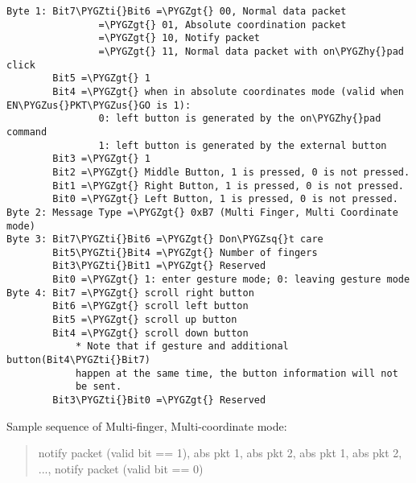 \documentclass[a4paper,8pt,english]{sphinxmanual}
\def\PYGZus{\char`\_}
\def\PYGZgt{\char`\>}
\def\PYGZhy{\char`\-}
\def\PYGZsq{\char`\'}
\def\PYGZti{\char`\~}
\renewcommand\PYGZsq{\textquotesingle}
\begin{document}
\begin{Verbatim}[commandchars=\\\{\}]
Byte 1: Bit7\PYGZti{}Bit6 =\PYGZgt{} 00, Normal data packet
                =\PYGZgt{} 01, Absolute coordination packet
                =\PYGZgt{} 10, Notify packet
                =\PYGZgt{} 11, Normal data packet with on\PYGZhy{}pad click
        Bit5 =\PYGZgt{} 1
        Bit4 =\PYGZgt{} when in absolute coordinates mode (valid when EN\PYGZus{}PKT\PYGZus{}GO is 1):
                0: left button is generated by the on\PYGZhy{}pad command
                1: left button is generated by the external button
        Bit3 =\PYGZgt{} 1
        Bit2 =\PYGZgt{} Middle Button, 1 is pressed, 0 is not pressed.
        Bit1 =\PYGZgt{} Right Button, 1 is pressed, 0 is not pressed.
        Bit0 =\PYGZgt{} Left Button, 1 is pressed, 0 is not pressed.
Byte 2: Message Type =\PYGZgt{} 0xB7 (Multi Finger, Multi Coordinate mode)
Byte 3: Bit7\PYGZti{}Bit6 =\PYGZgt{} Don\PYGZsq{}t care
        Bit5\PYGZti{}Bit4 =\PYGZgt{} Number of fingers
        Bit3\PYGZti{}Bit1 =\PYGZgt{} Reserved
        Bit0 =\PYGZgt{} 1: enter gesture mode; 0: leaving gesture mode
Byte 4: Bit7 =\PYGZgt{} scroll right button
        Bit6 =\PYGZgt{} scroll left button
        Bit5 =\PYGZgt{} scroll up button
        Bit4 =\PYGZgt{} scroll down button
            * Note that if gesture and additional button(Bit4\PYGZti{}Bit7)
            happen at the same time, the button information will not
            be sent.
        Bit3\PYGZti{}Bit0 =\PYGZgt{} Reserved
\end{Verbatim}

Sample sequence of Multi-finger, Multi-coordinate mode:
\begin{quote}

notify packet (valid bit == 1), abs pkt 1, abs pkt 2, abs pkt 1,
abs pkt 2, ..., notify packet (valid bit == 0)
\end{quote}
\end{document}
